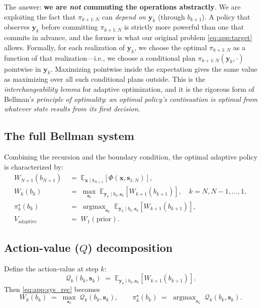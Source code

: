 \documentclass[11pt,a4paper]{article}
\newcommand{\E}{\mathbb{E}}
\newcommand{\argmax}{\operatorname{argmax}}
\begin{document}
The answer: \textbf{we are \emph{not} commuting the operations abstractly}.  We are exploiting the fact that $\pi_{k+1:N}$ can \emph{depend on $\bm{y}_k$} (through $b_{k+1}$).  A policy that observes $\bm{y}_k$ before committing $\pi_{k+1:N}$ is strictly more powerful than one that commits in advance, and the former is what our original problem \eqref{eq:app:target} allows.  Formally, for each realization of $\bm{y}_k$, we choose the optimal $\pi_{k+1:N}$ as a function of that realization---i.e., we choose a conditional plan $\pi_{k+1:N}(\bm{y}_k, \cdot)$ pointwise in $\bm{y}_k$.  Maximizing pointwise inside the expectation gives the same value as maximizing over all such conditional plans outside.  This is the \emph{interchangeability lemma} for adaptive optimization, and it is the rigorous form of Bellman's \emph{principle of optimality}: \emph{an optimal policy's continuation is optimal from whatever state results from its first decision}.

\subsection{The full Bellman system}

Combining the recursion and the boundary condition, the optimal adaptive policy is characterized by:
\begin{align}
  W_{N+1}(b_{N+1}) &\;=\; \E_{\bm{x} \mid b_{N+1}}\!\left[\Phi(\bm{x}, \bm{s}_{1:N})\right], \label{eq:app:sys_terminal} \\
  W_k(b_k) &\;=\; \max_{\bm{s}_k}\; \E_{\bm{y}_k \mid b_k, \bm{s}_k}\!\left[W_{k+1}(b_{k+1})\right], \quad k = N, N-1, \ldots, 1, \label{eq:app:sys_rec} \\
  \pi^\star_k(b_k) &\;=\; \argmax_{\bm{s}_k}\; \E_{\bm{y}_k \mid b_k, \bm{s}_k}\!\left[W_{k+1}(b_{k+1})\right], \label{eq:app:sys_policy} \\
  V_{\text{adaptive}} &\;=\; W_1(\text{prior}). \label{eq:app:sys_value}
\end{align}

\subsection{Action-value (\texorpdfstring{$Q$}{Q}) decomposition}

Define the action-value at step $k$:
\begin{equation}
  \mathcal{Q}_k(b_k, \bm{s}_k) \;=\; \E_{\bm{y}_k \mid b_k, \bm{s}_k}\!\left[W_{k+1}(b_{k+1})\right].
  \label{eq:app:Q}
\end{equation}
Then \eqref{eq:app:sys_rec} becomes
\begin{equation}
  W_k(b_k) \;=\; \max_{\bm{s}_k}\; \mathcal{Q}_k(b_k, \bm{s}_k), \qquad \pi^\star_k(b_k) \;=\; \argmax_{\bm{s}_k}\; \mathcal{Q}_k(b_k, \bm{s}_k).
\end{equation}
\end{document}
